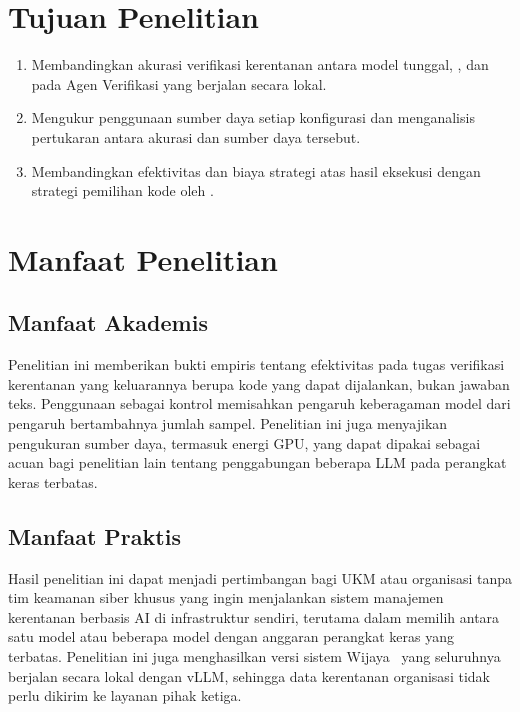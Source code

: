 \section{Tujuan Penelitian}
\label{sec:tujuan}
\begin{enumerate}
  \item Membandingkan akurasi verifikasi kerentanan antara model tunggal,
        , dan  pada Agen Verifikasi
        yang berjalan secara lokal.
  \item Mengukur penggunaan sumber daya setiap konfigurasi dan menganalisis
        pertukaran antara akurasi dan sumber daya tersebut.
  \item Membandingkan efektivitas dan biaya strategi  atas hasil
        eksekusi dengan strategi pemilihan kode oleh .
\end{enumerate}

\section{Manfaat Penelitian}
\label{sec:manfaat}
\subsection{Manfaat Akademis}
Penelitian ini memberikan bukti empiris tentang efektivitas 
pada tugas verifikasi kerentanan yang keluarannya berupa kode yang dapat
dijalankan, bukan jawaban teks. Penggunaan  sebagai
kontrol memisahkan pengaruh keberagaman model dari pengaruh bertambahnya
jumlah sampel. Penelitian ini juga menyajikan pengukuran sumber daya, termasuk
energi GPU, yang dapat dipakai sebagai acuan bagi penelitian lain tentang
penggabungan beberapa LLM pada perangkat keras terbatas.

\subsection{Manfaat Praktis}
Hasil penelitian ini dapat menjadi pertimbangan bagi UKM atau organisasi tanpa
tim keamanan siber khusus yang ingin menjalankan sistem manajemen kerentanan
berbasis AI di infrastruktur sendiri, terutama dalam memilih antara satu model
atau beberapa model dengan anggaran perangkat keras yang terbatas. Penelitian
ini juga menghasilkan versi sistem Wijaya~\cite{wijaya2026} yang seluruhnya
berjalan secara lokal dengan vLLM, sehingga data kerentanan organisasi tidak
perlu dikirim ke layanan pihak ketiga.

